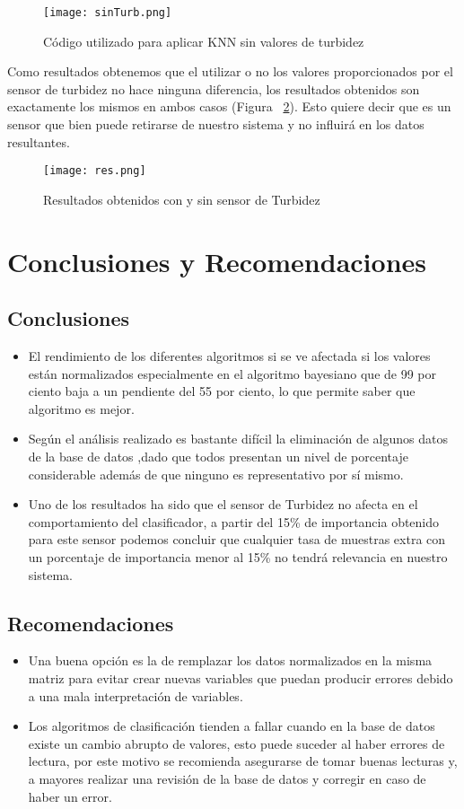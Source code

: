 \documentclass[10pt,a4paper]{article}
\begin{document}
\begin{figure}[H]
\centering
\texttt{[image: sinTurb.png]}
\caption{Código utilizado para aplicar KNN sin valores de turbidez}
\label{sin}
\end{figure}

Como resultados obtenemos que el utilizar o no los valores proporcionados por el sensor de turbidez no hace ninguna diferencia, los resultados obtenidos son exactamente los mismos en ambos casos (Figura ~\ref{res}). Esto quiere decir que es un sensor que bien puede retirarse de nuestro sistema y no influirá en los datos resultantes.

\begin{figure}[H]
\centering
\texttt{[image: res.png]}
\caption{Resultados obtenidos con y sin sensor de Turbidez}
\label{res}
\end{figure}

\section{Conclusiones y Recomendaciones}

\subsection*{Conclusiones}
\begin{itemize}
\item El rendimiento de los diferentes algoritmos si se ve afectada si los valores están normalizados especialmente en el algoritmo bayesiano que de 99 por ciento baja a un pendiente del 55 por ciento, lo que permite saber que algoritmo es mejor.
\item Según el análisis realizado es bastante difícil la eliminación de algunos datos de la base de datos ,dado que todos presentan un nivel de porcentaje considerable además de que ninguno es representativo por sí mismo.
\item Uno de los resultados ha sido que el sensor de Turbidez no afecta en el comportamiento del clasificador, a partir del 15\% de importancia obtenido para este sensor podemos concluir que cualquier tasa de muestras extra con un porcentaje de importancia menor al 15\% no tendrá relevancia en nuestro sistema.
\end{itemize}

\subsection*{Recomendaciones}
\begin{itemize}
\renewcommand{\labelitemi}{$*$}
\item Una buena opción es la de remplazar los datos normalizados en la misma matriz para evitar crear nuevas variables que puedan producir errores debido a una mala interpretación de variables.
\item Los algoritmos de clasificación tienden a fallar cuando en la base de datos existe un cambio abrupto de valores, esto puede suceder al haber errores de lectura, por este motivo se recomienda asegurarse de tomar buenas lecturas y, a mayores realizar una revisión de la base de datos y corregir en caso de haber un error.
\end{itemize}

\end{document}
